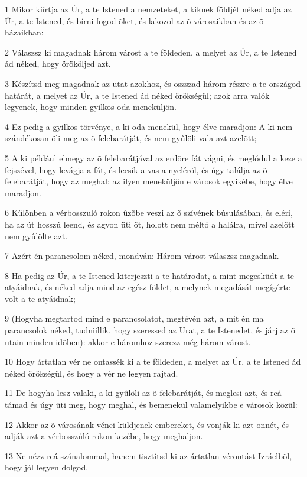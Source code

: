 \par 1 Mikor kiírtja az Úr, a te Istened a nemzeteket, a kiknek földjét néked adja az Úr, a te Istened, és bírni fogod õket, és lakozol az õ városaikban és az õ házaikban:
\par 2 Válaszsz ki magadnak három várost a te földeden, a melyet az Úr, a te Istened ád néked, hogy örököljed azt.
\par 3 Készítsd meg magadnak az utat azokhoz, és oszszad három részre a te országod határát, a melyet az Úr, a te Istened ád néked örökségül; azok arra valók legyenek, hogy minden gyilkos oda meneküljön.
\par 4 Ez pedig a gyilkos törvénye, a ki oda menekül, hogy élve maradjon: A ki nem szándékosan öli meg az õ felebarátját, és nem gyûlöli vala azt azelõtt;
\par 5 A ki például elmegy az õ felebarátjával az erdõre fát vágni, és meglódul a keze a fejszével, hogy levágja a fát, és leesik a vas a nyelérõl, és úgy találja az õ felebarátját, hogy az meghal: az ilyen meneküljön e városok egyikébe, hogy élve maradjon.
\par 6 Különben a vérbosszuló rokon ûzõbe veszi az õ szívének búsulásában, és eléri, ha az út hosszú leend, és agyon üti õt, holott nem méltó a halálra, mivel azelõtt nem gyûlölte azt.
\par 7 Azért én parancsolom néked, mondván: Három várost válaszsz magadnak.
\par 8 Ha pedig az Úr, a te Istened kiterjeszti a te határodat, a mint megesküdt a te atyáidnak, és néked adja mind az egész földet, a melynek megadását megígérte volt a te atyáidnak;
\par 9 (Hogyha megtartod mind e parancsolatot, megtévén azt, a mit én ma parancsolok néked, tudniillik, hogy szeressed az Urat, a te Istenedet, és járj az õ utain minden idõben): akkor e háromhoz szerezz még három várost.
\par 10 Hogy ártatlan vér ne ontassék ki a te földeden, a melyet az Úr, a te Istened ád néked örökségül, és hogy a vér ne legyen rajtad.
\par 11 De hogyha lesz valaki, a ki gyûlöli az õ felebarátját, és meglesi azt, és reá támad és úgy üti meg, hogy meghal, és bemenekül valamelyikbe e városok közül:
\par 12 Akkor az õ városának vénei küldjenek embereket, és vonják ki azt onnét, és adják azt a vérbosszúló rokon kezébe, hogy meghaljon.
\par 13 Ne nézz reá szánalommal, hanem tisztítsd ki az ártatlan vérontást Izráelbõl, hogy jól legyen dolgod.
